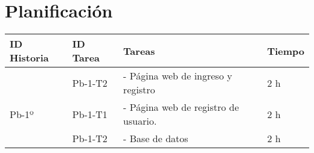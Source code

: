 \chapter{Planificación}

\begin{table}[htbp]
	\begin{center}
		\begin{tabular}{| p{2.0cm}|p{2.0cm} | p{5.5 cm} | p{3.0cm}| }
			\hline
			\centering\textbf{ID Historia} & \textbf{ID Tarea}& \textbf{Tareas} & \textbf{Tiempo}
			
			\\\hline
			
			 & \centering Pb-1-T2 & - Página web de ingreso y registro & 2 h
			\\
			\centering Pb-1º & \centering Pb-1-T1 & - Página web de registro de usuario. & 2 h
			\\
			& \centering Pb-1-T2 & - Base de datos & 2 h
			
			\\\hline
		\end{tabular}
	\end{center}
\end{table}